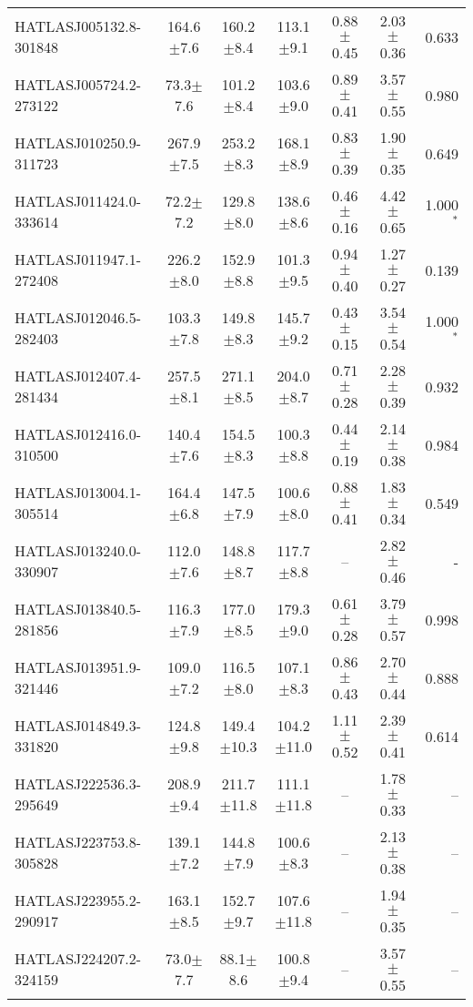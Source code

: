 \begin{landscape}
\begin{longtable}{lcccccr}
    HATLASJ005132.8-301848 & 164.6$\pm$7.6 & 160.2$\pm$8.4 & 113.1$\pm$9.1 & 0.88$\pm$0.45 & 2.03$\pm$0.36 & 0.633 \\
    HATLASJ005724.2-273122 & 73.3$\pm$7.6 & 101.2$\pm$8.4 & 103.6$\pm$9.0 & 0.89$\pm$0.41 & 3.57$\pm$0.55 & 0.980 \\
    HATLASJ010250.9-311723 & 267.9$\pm$7.5 & 253.2$\pm$8.3 & 168.1$\pm$8.9 & 0.83$\pm$0.39 & 1.90$\pm$0.35 & 0.649 \\
    HATLASJ011424.0-333614 & 72.2$\pm$7.2 & 129.8$\pm$8.0 & 138.6$\pm$8.6 & 0.46$\pm$0.16 & 4.42$\pm$0.65 & 1.000$^{\ast}$ \\
    HATLASJ011947.1-272408 & 226.2$\pm$8.0 & 152.9$\pm$8.8 & 101.3$\pm$9.5 & 0.94$\pm$0.40 & 1.27$\pm$0.27 & 0.139 \\
    HATLASJ012046.5-282403 & 103.3$\pm$7.8 & 149.8$\pm$8.3 & 145.7$\pm$9.2 & 0.43$\pm$0.15 & 3.54$\pm$0.54 & 1.000$^{\ast}$ \\
    HATLASJ012407.4-281434 & 257.5$\pm$8.1 & 271.1$\pm$8.5 & 204.0$\pm$8.7 & 0.71$\pm$0.28 & 2.28$\pm$0.39 & 0.932 \\
    HATLASJ012416.0-310500 & 140.4$\pm$7.6 & 154.5$\pm$8.3 & 100.3$\pm$8.8 & 0.44$\pm$0.19 & 2.14$\pm$0.38 & 0.984 \\
    HATLASJ013004.1-305514 & 164.4$\pm$6.8 & 147.5$\pm$7.9 & 100.6$\pm$8.0 & 0.88$\pm$0.41 & 1.83$\pm$0.34 & 0.549 \\
    HATLASJ013240.0-330907 & 112.0$\pm$7.6 & 148.8$\pm$8.7 & 117.7$\pm$8.8 & -- & 2.82$\pm$0.46 & - \\
    HATLASJ013840.5-281856 & 116.3$\pm$7.9 & 177.0$\pm$8.5 & 179.3$\pm$9.0 & 0.61$\pm$0.28 & 3.79$\pm$0.57 & 0.998 \\
    HATLASJ013951.9-321446 & 109.0$\pm$7.2 & 116.5$\pm$8.0 & 107.1$\pm$8.3 & 0.86$\pm$0.43 & 2.70$\pm$0.44 & 0.888 \\
    HATLASJ014849.3-331820 & 124.8$\pm$9.8 & 149.4$\pm$10.3 & 104.2$\pm$11.0 & 1.11$\pm$0.52 & 2.39$\pm$0.41 & 0.614 \\
    HATLASJ222536.3-295649 & 208.9$\pm$9.4 & 211.7$\pm$11.8 & 111.1$\pm$11.8 & -- & 1.78$\pm$0.33 & -- \\
    HATLASJ223753.8-305828 & 139.1$\pm$7.2 & 144.8$\pm$7.9 & 100.6$\pm$8.3 & -- & 2.13$\pm$0.38 & -- \\
    HATLASJ223955.2-290917 & 163.1$\pm$8.5 & 152.7$\pm$9.7 & 107.6$\pm$11.8 & -- & 1.94$\pm$0.35 & -- \\
    HATLASJ224207.2-324159 & 73.0$\pm$7.7 & 88.1$\pm$8.6 & 100.8$\pm$9.4 & -- & 3.57$\pm$0.55 & -- \\

\end{longtable}
\end{landscape}
